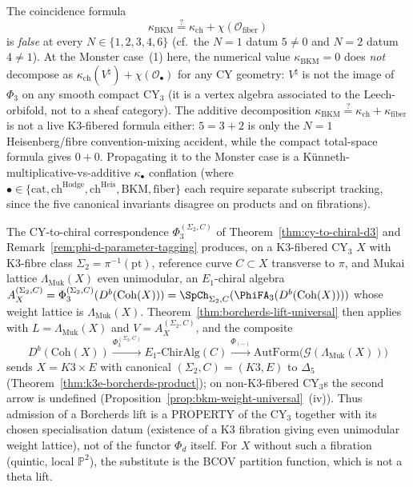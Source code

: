 \begin{remark}
\label{rem:monster-bkm-additivity-disclaimer}
The coincidence formula
\[
\kappa_{\mathrm{BKM}} \stackrel{?}{=} \kappa_{\mathrm{ch}} +
\chi(\mathcal{O}_{\mathrm{fiber}})
\]
is \emph{false} at every
$N \in \{1, 2, 3, 4, 6\}$ (cf.\ the $N=1$ datum $5 \ne 0$ and
$N = 2$ datum $4 \ne 1$). At the Monster case~(1) here, the
numerical value $\kappa_{\mathrm{BKM}} = 0$ does \emph{not} decompose
as $\kappa_{\mathrm{ch}}(V^\natural) + \chi(\mathcal{O}_{\bullet})$
for any CY geometry: $V^\natural$ is not the image of $\Phi_3$ on
any smooth compact CY$_3$ (it is a vertex algebra associated to the
Leech-orbifold, not to a sheaf category). The additive
decomposition $\kappa_{\mathrm{BKM}} \stackrel{?}{=} \kappa_{\mathrm{ch}} +
\kappa_{\mathrm{fiber}}$ is not a live K3-fibered formula either:
$5=3+2$ is only the $N=1$ Heisenberg/fibre convention-mixing
accident, while the compact total-space formula gives $0+0$.
Propagating it to the Monster case is a
Künneth-multiplicative-vs-additive $\kappa_\bullet$ conflation
(where $\bullet \in \{\mathrm{cat}, \mathrm{ch}^{\mathrm{Hodge}},
\mathrm{ch}^{\mathrm{Heis}}, \mathrm{BKM}, \mathrm{fiber}\}$ each
require separate subscript tracking, since the five canonical
invariants disagree on products and on fibrations).
\end{remark}

\begin{remark}
\label{rem:cya3-borcherds-lift-compatibility}
The CY-to-chiral correspondence $\Phi_3^{(\Sigma_2, C)}$ of
Theorem~\ref{thm:cy-to-chiral-d3} and
Remark~\ref{rem:phi-d-parameter-tagging} produces, on a K3-fibered CY$_3$
$X$ with K3-fibre class $\Sigma_2 = \pi^{-1}(\mathrm{pt})$, reference curve
$C \subset X$ transverse to $\pi$, and Mukai lattice
$\Lambda_{\mathrm{Muk}}(X)$ even unimodular, an $E_1$-chiral algebra
$A_X^{(\Sigma_2, C)} = \Phi_3^{(\Sigma_2, C)}(D^b(\mathrm{Coh}(X))) =
\SpCh_{\Sigma_2, C}(\PhiFA_3(D^b(\mathrm{Coh}(X))))$ whose weight lattice is
$\Lambda_{\mathrm{Muk}}(X)$. Theorem~\ref{thm:borcherds-lift-universal} then
applies with $L = \Lambda_{\mathrm{Muk}}(X)$ and $V = A_X^{(\Sigma_2, C)}$,
and the composite
\[
 D^b(\mathrm{Coh}(X)) \xrightarrow{\Phi_3^{(\Sigma_2, C)}} E_1\text{-ChirAlg}(C) \xrightarrow{\Phi_{(-)}} \mathrm{AutForm}\bigl(\mathcal{G}(\Lambda_{\mathrm{Muk}}(X))\bigr)
\]
sends $X = K3 \times E$ with canonical $(\Sigma_2, C) = (K3, E)$ to $\Delta_5$
(Theorem~\ref{thm:k3e-borcherds-product}); on non-K3-fibered CY$_3$s the
second arrow is undefined
(Proposition~\ref{prop:bkm-weight-universal}~(iv)). Thus admission of a
Borcherds lift is a PROPERTY of the CY$_3$ together with its chosen
specialisation datum (existence of a K3 fibration giving even unimodular
weight lattice), not of the functor $\Phi_d$ itself. For $X$ without such
a fibration (quintic, local $\mathbb{P}^2$), the substitute is the BCOV
partition function, which is not a theta lift.
\end{remark}

